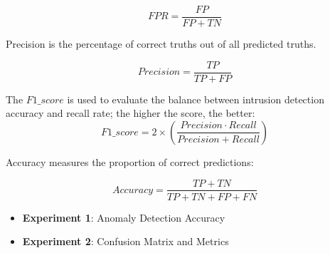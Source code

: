 \begin{equation}
    FPR = \frac{FP}{FP + TN}
\end{equation}

Precision is the percentage of correct truths out of all predicted truths.

\begin{equation}
    Precision = \frac{TP}{TP + FP}
\end{equation}


The $F1\_{score}$ is used to evaluate the balance between intrusion detection accuracy and recall rate; the higher the score, the better:
\begin{equation}
    F1\_{score} = 2 \times (\frac{Precision \cdot Recall}{Precision + Recall})
\end{equation}

Accuracy measures the proportion of correct predictions:

\begin{equation}
    Accuracy = \frac{TP + TN}{TP + TN + FP + FN}
\end{equation}


\begin{itemize}
    \item \textbf{Experiment 1}: Anomaly Detection Accuracy
    \item \textbf{Experiment 2}: Confusion Matrix and Metrics
\end{itemize}

